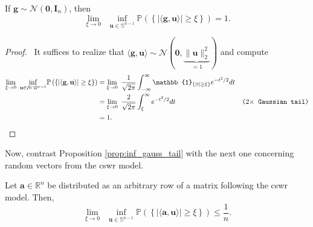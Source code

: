 \begin{proposition}\label{prop:inf_gauss_tail}
    If $\mathbf{g} \sim \mathcal{N}(\mathbf{0}, \mathbf{I}_n)$, then
    \begin{equation}
        \underset{\xi \to 0}{\lim} \enspace \underset{\mathbf{u} \in \mathbb{S}^{n-1}}{\inf} \mathbb{P} \left ( \left \{ | \langle \mathbf{g}, \mathbf{u}\rangle | \geq \xi \right \} \right ) = 1.
    \end{equation}
\end{proposition}

\begin{proof}
    \pf\ It suffices to realize that $\langle \mathbf{g}, \mathbf{u} \rangle \sim \mathcal{N}(\mathbf{0}, \underbrace{\|\mathbf{u}\|_{2}^2}_{=1})$ and compute
    \begin{align*}
        \underset{\xi \to 0}{\lim} \enspace \underset{\mathbf{u} \in \mathcal{S} \cap \mathbb{S}^{n-1}}{\inf} \mathbb{P} \left ( \left \{ | \langle \mathbf{g}, \mathbf{u}\rangle | \geq \xi \right \} \right ) & = \underset{\xi \to 0}{\lim} \enspace \frac{1}{\sqrt{2\pi}}\int_{-\infty}^{\infty} \mathbb{1}_{\{ |t| \geq \xi \}} e^{-t^2/2} dt \\
        & = \underset{\xi \to 0}{\lim} \enspace \frac{2}{\sqrt{2\pi}}\int_{\xi}^{\infty} e^{-t^2/2} dt & \comment{$2\times$ Gaussian tail}\\
        & = 1.
    \end{align*}
    \hfill\qedsymbol
\end{proof}

Now, contrast Proposition \ref{prop:inf_gauss_tail} with the next one concerning random vectors from the \acrfull{cswr} model.

\begin{proposition}\label{prop:inf_cswr_tail}
    Let $\mathbf{a} \in \mathbb{R}^{n}$ be distributed as an arbitrary row of a matrix following the \acrshort{cswr} model. Then,
    \begin{equation}
        \underset{\xi \to 0}{\lim} \enspace \underset{\mathbf{u} \in \mathbb{S}^{n-1}}{\inf} \mathbb{P} \left ( \left \{ | \langle \mathbf{a}, \mathbf{u}\rangle | \geq \xi \right \} \right ) \leq \frac{1}{n}.
    \end{equation}
\end{proposition}

